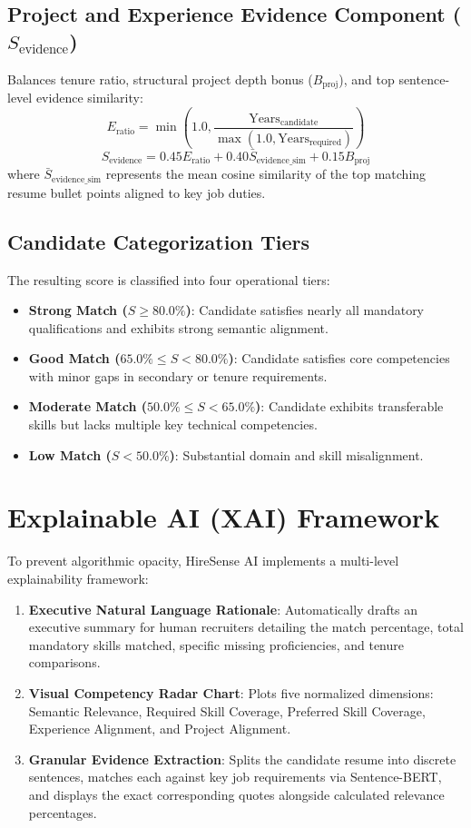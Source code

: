 \documentclass[12pt,a4paper]{report}
\begin{document}
\subsection{Project and Experience Evidence Component ($S_{\text{evidence}}$)}
Balances tenure ratio, structural project depth bonus ($B_{\text{proj}}$), and top sentence-level evidence similarity:
\begin{equation}
E_{\text{ratio}} = \min\left(1.0, \frac{\text{Years}_{\text{candidate}}}{\max(1.0, \text{Years}_{\text{required}})}\right)
\end{equation}
\begin{equation}
S_{\text{evidence}} = 0.45 E_{\text{ratio}} + 0.40 \bar{S}_{\text{evidence\_sim}} + 0.15 B_{\text{proj}}
\end{equation}
where $\bar{S}_{\text{evidence\_sim}}$ represents the mean cosine similarity of the top matching resume bullet points aligned to key job duties.

\subsection{Candidate Categorization Tiers}
The resulting score is classified into four operational tiers:
\begin{itemize}
    \item \textbf{Strong Match ($S \ge 80.0\%$)}: Candidate satisfies nearly all mandatory qualifications and exhibits strong semantic alignment.
    \item \textbf{Good Match ($65.0\% \le S < 80.0\%$)}: Candidate satisfies core competencies with minor gaps in secondary or tenure requirements.
    \item \textbf{Moderate Match ($50.0\% \le S < 65.0\%$)}: Candidate exhibits transferable skills but lacks multiple key technical competencies.
    \item \textbf{Low Match ($S < 50.0\%$)}: Substantial domain and skill misalignment.
\end{itemize}

\section{Explainable AI (XAI) Framework}
To prevent algorithmic opacity, HireSense AI implements a multi-level explainability framework:
\begin{enumerate}
    \item \textbf{Executive Natural Language Rationale}: Automatically drafts an executive summary for human recruiters detailing the match percentage, total mandatory skills matched, specific missing proficiencies, and tenure comparisons.
    \item \textbf{Visual Competency Radar Chart}: Plots five normalized dimensions: Semantic Relevance, Required Skill Coverage, Preferred Skill Coverage, Experience Alignment, and Project Alignment.
    \item \textbf{Granular Evidence Extraction}: Splits the candidate resume into discrete sentences, matches each against key job requirements via Sentence-BERT, and displays the exact corresponding quotes alongside calculated relevance percentages.
\end{enumerate}
\end{document}
